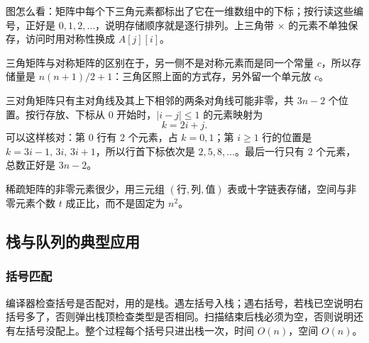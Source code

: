\begin{center}
\end{center}
{\footnotesize\noindent 图怎么看：矩阵中每个下三角元素都标出了它在一维数组中的下标；按行读这些编号，正好是 $0,1,2,\ldots$，说明存储顺序就是逐行排列。上三角带 $\times$ 的元素不单独保存，访问时用对称性换成 $A[j][i]$。\par}

三角矩阵与对称矩阵的区别在于，另一侧不是对称元素而是同一个常量 $c$，所以存储量是 $n(n+1)/2+1$：三角区照上面的方式存，另外留一个单元放 $c$。

三对角矩阵只有主对角线及其上下相邻的两条对角线可能非零，共 $3n-2$ 个位置。按行存放、下标从 $0$ 开始时，$|i-j|\leqslant 1$ 的元素映射为
\[
k=2i+j .
\]
可以这样核对：第 $0$ 行有 $2$ 个元素，占 $k=0,1$；第 $i\geqslant1$ 行的位置是 $k=3i-1,\,3i,\,3i+1$，所以行首下标依次是 $2,5,8,\ldots$。最后一行只有 $2$ 个元素，总数正好是 $3n-2$。

稀疏矩阵的非零元素很少，用三元组 $(\text{行},\text{列},\text{值})$ 表或十字链表存储，空间与非零元素个数 $t$ 成正比，而不是固定为 $n^2$。

\subsection{栈与队列的典型应用}

\subsubsection*{括号匹配}

编译器检查括号是否配对，用的是栈。遇左括号入栈；遇右括号，若栈已空说明右括号多了，否则弹出栈顶检查类型是否相同。扫描结束后栈必须为空，否则说明还有左括号没配上。整个过程每个括号只进出栈一次，时间 $O(n)$，空间 $O(n)$。

